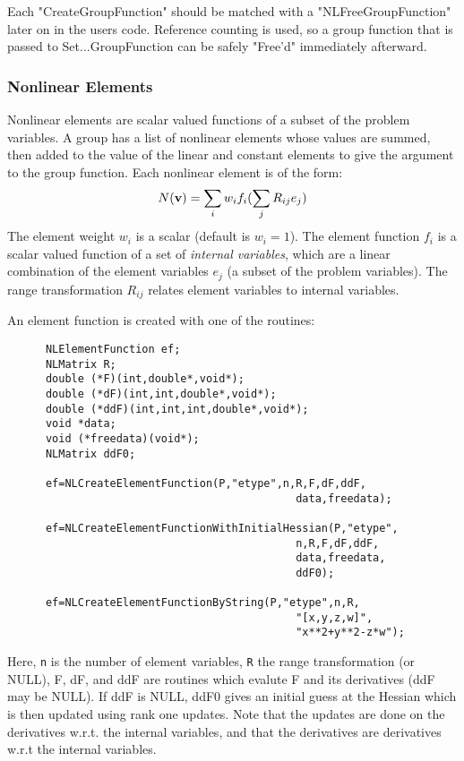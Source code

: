\documentclass[12pt]{article}
\begin{document}
      Each "CreateGroupFunction" should be matched with a "NLFreeGroupFunction" later on in the users code. Reference
      counting is used, so a group function that is passed to Set...GroupFunction can be safely "Free'd" immediately 
      afterward.

   \subsubsection{Nonlinear Elements}

      Nonlinear elements are scalar valued functions of a subset of the problem variables. A group has a list of nonlinear
      elements whose values are summed, then added to the value of the linear and constant elements to give the argument
      to the group function. Each nonlinear element is of the form:
     \begin{displaymath}
          N({\bf v}) = \sum_i w_i f_i( \sum_j R_{ij} e_j )
     \end{displaymath}
     The element weight $w_i$ is a scalar (default is $w_i=1$). The element function $f_i$ is a scalar valued function
     of a set of {\it internal variables}, which are a linear combination of the element variables $e_j$ (a subset of
     the problem variables). The range transformation $R_{ij}$ relates element variables to internal variables.

     An element function is created with one of the routines:
     \begin{verbatim}
      NLElementFunction ef;
      NLMatrix R;
      double (*F)(int,double*,void*);
      double (*dF)(int,int,double*,void*);
      double (*ddF)(int,int,int,double*,void*);
      void *data;
      void (*freedata)(void*);
      NLMatrix ddF0;

      ef=NLCreateElementFunction(P,"etype",n,R,F,dF,ddF,
                                             data,freedata);

      ef=NLCreateElementFunctionWithInitialHessian(P,"etype",
                                             n,R,F,dF,ddF,
                                             data,freedata,
                                             ddF0);

      ef=NLCreateElementFunctionByString(P,"etype",n,R,
                                             "[x,y,z,w]",
                                             "x**2+y**2-z*w");
     \end{verbatim}
     Here, {\tt n} is the number of element variables, {\tt R} the range transformation (or NULL), F, dF, and ddF
     are routines which evalute F and its derivatives (ddF may be NULL). If ddF is NULL, ddF0 gives an initial
     guess at the Hessian which is then updated using rank one updates. Note that the updates are done on the
     derivatives w.r.t. the internal variables, and that the derivatives are derivatives w.r.t the internal variables.
\end{document}
